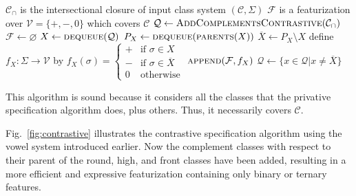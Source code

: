 \documentclass[11pt, oneside]{article}   	%
\begin{document}
\vspace{\baselineskip} \noindent \begin{algorithmic}
    \REQUIRE $\mathcal C_\cap$ is the intersectional closure of input class system $(\mathcal C, \Sigma)$
    \ENSURE $\mathcal F$ is a featurization over $\mathcal V = \{ +, -, 0 \}$ which covers $\mathcal C$
    \STATE
    \STATE $\mathcal Q \leftarrow \textsc{AddComplementsContrastive}(\mathcal{C_\cap})$
    \STATE $\mathcal F \leftarrow \varnothing$
    \STATE
        \STATE $X \leftarrow \textsc{dequeue}(\mathcal Q)$
            \STATE $P_X \leftarrow \textsc{dequeue}(\textsc{parents}(X))$
            \STATE $\overline{X} \leftarrow P_X \setminus X$
            \STATE define $f_X : \Sigma \rightarrow \mathcal V$ by $f_X (\sigma) = \begin{cases}
                    + & \text{if } \sigma \in X \\
                    - & \text{if } \sigma \in \overline{X} \\
                    0 & \text{otherwise}
                    \end{cases}$
            \STATE $\textsc{append}(\mathcal F, f_X)$
            \STATE $\mathcal{Q} \leftarrow \{x \in \mathcal{Q} \vert x \neq \overline{X} \}$
        \ENDIF
    \ENDWHILE
\end{algorithmic}

\vspace{\baselineskip} \noindent This algorithm is sound because it considers all the classes that the privative specification algorithm does, plus others. Thus, it necessarily covers $\mathcal C$.

Fig.~\ref{fig:contrastive} illustrates the contrastive specification algorithm using the vowel system introduced earlier. Now the complement classes with respect to their parent of the round, high, and front classes have been added, resulting in a more efficient and expressive featurization containing only binary or ternary features.
\end{document}
